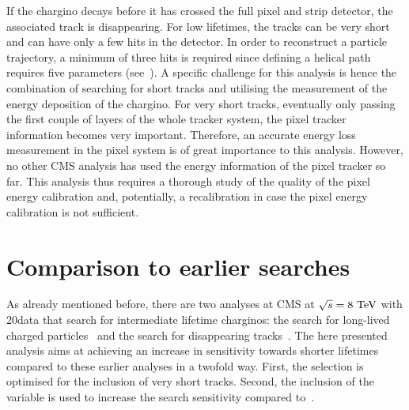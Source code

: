 If the chargino decays before it has crossed the full pixel and strip detector, the associated track is disappearing. 
For low lifetimes, the tracks can be very short and can have only a few hits in the detector. 
In order to reconstruct a particle trajectory, a minimum of three hits is required since defining a helical path requires five parameters (see~\cite{bib:CMS:tracking_8TeV}). 
A specific challenge for this analysis is hence the combination of searching for short tracks and utilising the measurement of the energy deposition of the chargino. 
For very short tracks, eventually only passing the first couple of layers of the whole tracker system, the pixel tracker information becomes very important. 
Therefore, an accurate energy loss measurement in the pixel system is of great importance to this analysis. 
However, no other CMS analysis has used the energy information of the pixel tracker so far.
This analysis thus requires a thorough study of the quality of the pixel energy calibration and, potentially, a recalibration in case the pixel energy calibration is not sufficient.



\section{Comparison to earlier searches}
As already mentioned before, there are two analyses at CMS at $\sqrt{s}=8\,\,\text{Te}\kern-0.06667em\text{V}$ with 20\fbinv data that search for intermediate lifetime charginos: the search for long-lived charged particles~\cite{bib:CMS:HSCP_8TeV} and the search for disappearing tracks~\cite{bib:CMS:DT_8TeV}.
The here presented analysis aims at achieving an increase in sensitivity towards shorter lifetimes compared to these earlier analyses in a twofold way.
First, the selection is optimised for the inclusion of very short tracks.
Second, the inclusion of the variable \dedx is used to increase the search sensitivity compared to~\cite{bib:CMS:DT_8TeV}.\\


